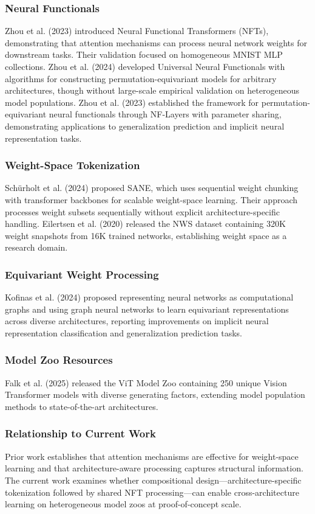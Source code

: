 
\subsubsection{Neural Functionals}

Zhou et al. (2023) introduced Neural Functional Transformers (NFTs), demonstrating that attention mechanisms can process neural network weights for downstream tasks. Their validation focused on homogeneous MNIST MLP collections. Zhou et al. (2024) developed Universal Neural Functionals with algorithms for constructing permutation-equivariant models for arbitrary architectures, though without large-scale empirical validation on heterogeneous model populations. Zhou et al. (2023) established the framework for permutation-equivariant neural functionals through NF-Layers with parameter sharing, demonstrating applications to generalization prediction and implicit neural representation tasks.

\subsubsection{Weight-Space Tokenization}

Schürholt et al. (2024) proposed SANE, which uses sequential weight chunking with transformer backbones for scalable weight-space learning. Their approach processes weight subsets sequentially without explicit architecture-specific handling. Eilertsen et al. (2020) released the NWS dataset containing 320K weight snapshots from 16K trained networks, establishing weight space as a research domain.

\subsubsection{Equivariant Weight Processing}

Kofinas et al. (2024) proposed representing neural networks as computational graphs and using graph neural networks to learn equivariant representations across diverse architectures, reporting improvements on implicit neural representation classification and generalization prediction tasks.

\subsubsection{Model Zoo Resources}

Falk et al. (2025) released the ViT Model Zoo containing 250 unique Vision Transformer models with diverse generating factors, extending model population methods to state-of-the-art architectures.

\subsubsection{Relationship to Current Work}

Prior work establishes that attention mechanisms are effective for weight-space learning and that architecture-aware processing captures structural information. The current work examines whether compositional design---architecture-specific tokenization followed by shared NFT processing---can enable cross-architecture learning on heterogeneous model zoos at proof-of-concept scale.
